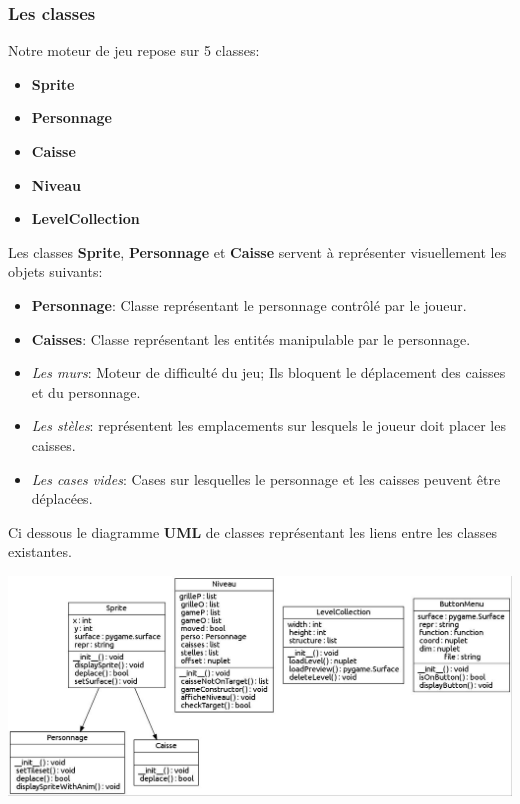 \documentclass{article}
\begin{document}
		\subsubsection{Les classes}
Notre moteur de jeu repose sur 5 classes:
\begin{itemize}
\item \textbf{Sprite} 
\item \textbf{Personnage }
\item \textbf{Caisse}
\item \textbf{Niveau}
\item \textbf{LevelCollection}
\end{itemize}
Les classes \textbf{Sprite}, \textbf{Personnage} et \textbf{Caisse} servent à représenter visuellement les objets suivants:
\begin{itemize}
\item \textbf{Personnage}: Classe représentant le personnage contrôlé par le joueur.
\item \textbf{Caisses}: Classe représentant les entités manipulable par le personnage.
\item \textit{Les murs}: Moteur de difficulté du jeu; Ils bloquent le déplacement des caisses et du personnage.
\item \textit{Les stèles}: représentent les emplacements sur lesquels le joueur doit placer les caisses.
\item \textit{Les cases vides}: Cases sur lesquelles le personnage et les caisses peuvent être déplacées.
\end{itemize}
Ci dessous le diagramme \textbf{UML} de classes représentant les liens entre les classes existantes.
\begin{center}
\includegraphics[scale=0.4]{img/dia.jpg}
\end{center}
\end{document}
